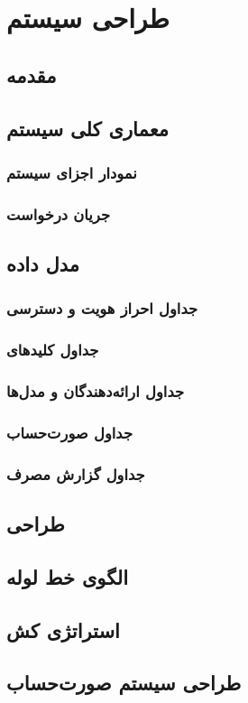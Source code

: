 \chapter{طراحی سیستم}
\label{ch:design}

\section{مقدمه}
\section{معماری کلی سیستم}
\subsection{نمودار اجزای سیستم}
\subsection{جریان درخواست}
\section{مدل داده}
\subsection{جداول احراز هویت و دسترسی}
\subsection{جداول کلیدهای }
\subsection{جداول ارائه‌دهندگان و مدل‌ها}
\subsection{جداول صورت‌حساب}
\subsection{جداول گزارش مصرف}
\section{طراحی }
\section{الگوی خط لوله}
\section{استراتژی کش}
\section{طراحی سیستم صورت‌حساب}
